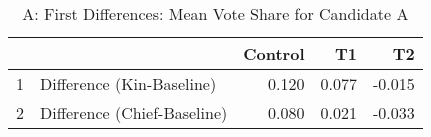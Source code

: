 \begin{table}[ht]
\centering
\caption{A: First Differences: Mean Vote Share for Candidate A} 
\begin{tabular}{rlrrr}
  \hline
 &  & Control & T1 & T2 \\ 
  \hline
1 & Difference (Kin-Baseline) & 0.120 & 0.077 & -0.015 \\ 
  2 & Difference (Chief-Baseline) & 0.080 & 0.021 & -0.033 \\ 
   \hline
\end{tabular}
\end{table}
